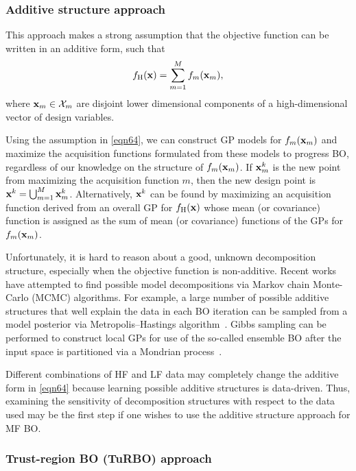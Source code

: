 \documentclass[journal ]{new-aiaa}
\begin{document}
\subsubsection{Additive structure approach}\label{Sec622}

This approach makes a strong assumption that the objective function can be written in an additive form, such that~\citep{Kandasamy2015}
\begin{equation}\label{eqn64}
	f_\text{H}({\bf x}) = \sum_{m=1}^{M}f_m({\bf x}_m), 
\end{equation}
where ${\bf x}_m \in \mathcal{X}_m$ are disjoint lower dimensional components of a high-dimensional vector of design variables.

Using the assumption in \cref{eqn64}, we can construct GP models for $f_m({\bf x}_m)$ and maximize the acquisition functions formulated from these models to progress BO, regardless of our knowledge on the structure of $f_m({\bf x}_m)$.
If ${\bf x}^k_m$ is the new point from maximizing the acquisition function $m$, then the new design point is ${\bf x}^k = \bigcup_{m=1}^M {\bf x}^k_m$.
Alternatively, ${\bf x}^k$ can be found by maximizing an acquisition function derived from an overall GP for $f_\text{H}({\bf x})$ whose mean (or covariance) function is assigned as the sum of mean (or covariance) functions of the GPs for $f_m({\bf x}_m)$. 

Unfortunately, it is hard to reason about a good, unknown decomposition structure, especially when the objective function is non-additive. 
Recent works have attempted to find possible model decompositions via Markov chain Monte-Carlo (MCMC) algorithms.
For example, a large number of possible additive structures that well explain the data in each BO iteration can be sampled from a model posterior via Metropolis–Hastings algorithm~\citep{Gardner2017}. 
Gibbs sampling can be performed to construct local GPs for use of the so-called ensemble BO after the input space is partitioned via a Mondrian process~\citep{WangZ2018}.

Different combinations of HF and LF data may completely change the additive form in \cref{eqn64} because learning possible additive structures is data-driven.
Thus, examining the sensitivity of decomposition structures with respect to the data used may be the first step if one wishes to use the additive structure approach for MF BO.

\subsubsection{Trust-region BO (TuRBO) approach}\label{Sec623}
\end{document}

